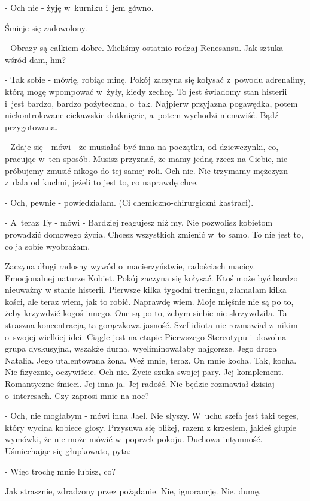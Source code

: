 \documentclass[oneside,polish,12pt,sfheadings]{mwbk}
\begin{document}
- Och nie - żyję w~kurniku i~jem gówno.

Śmieje się zadowolony. 

- Obrazy są całkiem dobre. Mieliśmy ostatnio
rodzaj Renesansu. Jak sztuka wśród dam, hm?

- Tak sobie - mówię, robiąc minę. Pokój zaczyna się kołysać z~powodu
adrenaliny, którą mogę wpompować w~żyły, kiedy zechcę. To jest świadomy
stan histerii i~jest bardzo, bardzo pożyteczna, o~tak. Najpierw przyjazna
pogawędka, potem niekontrolowane ciekawskie dotknięcie, a~potem wychodzi
nienawiść. Bądź przygotowana.

- Zdaje się - mówi - że musiałaś być inna na początku, od dziewczynki,
co, pracując w~ten sposób. Musisz przyznać, że mamy jedną rzecz na
Ciebie, nie próbujemy zmusić nikogo do tej samej roli. Och nie. Nie
trzymamy mężczyzn z~dala od kuchni, jeżeli to jest to, co naprawdę
chce.

- Och, pewnie - powiedziałam. (Ci chemiczno-chirurgiczni kastraci).

- A~teraz Ty - mówi - Bardziej reagujesz niż my. Nie pozwolisz kobietom
prowadzić domowego życia. Chcesz wszystkich zmienić w~to samo. To
nie jest to, co ja sobie wyobrażam.

Zaczyna długi radosny wywód o~macierzyństwie, radościach macicy. Emocjonalnej
naturze Kobiet. Pokój zaczyna się kołysać. Ktoś może być bardzo nieuważny
w stanie histerii. Pierwsze kilka tygodni treningu, złamałam kilka
kości, ale teraz wiem, jak to robić. Naprawdę wiem. Moje mięśnie nie
są po to, żeby krzywdzić kogoś innego. One są po to, żebym siebie
nie skrzywdziła. Ta straszna koncentracja, ta gorączkowa jasność.
Szef idiota nie rozmawiał z~nikim o~swojej wielkiej idei. Ciągle jest
na etapie Pierwszego Stereotypu i~dowolna grupa dyskusyjna, wszakże
durna, wyeliminowałaby najgorsze. Jego droga Natalia. Jego utalentowana
żona. Weź mnie, teraz. On mnie kocha. Tak, kocha. Nie fizycznie, oczywiście.
Och nie. Życie szuka swojej pary. Jej komplement. Romantyczne śmieci.
Jej inna ja. Jej radość. Nie będzie rozmawiał dzisiaj o~interesach.
Czy zaprosi mnie na noc?

- Och, nie mogłabym - mówi inna Jael. Nie słyszy. W~uchu szefa jest
taki teges, który wycina kobiece głosy. Przysuwa się bliżej, razem
z krzesłem, jakieś głupie wymówki, że nie może mówić w~poprzek pokoju.
Duchowa intymność. Uśmiechając się głupkowato, pyta: 

- Więc trochę mnie lubisz, co?

Jak strasznie, zdradzony przez pożądanie. Nie, ignorancję. Nie, dumę.
\end{document}
